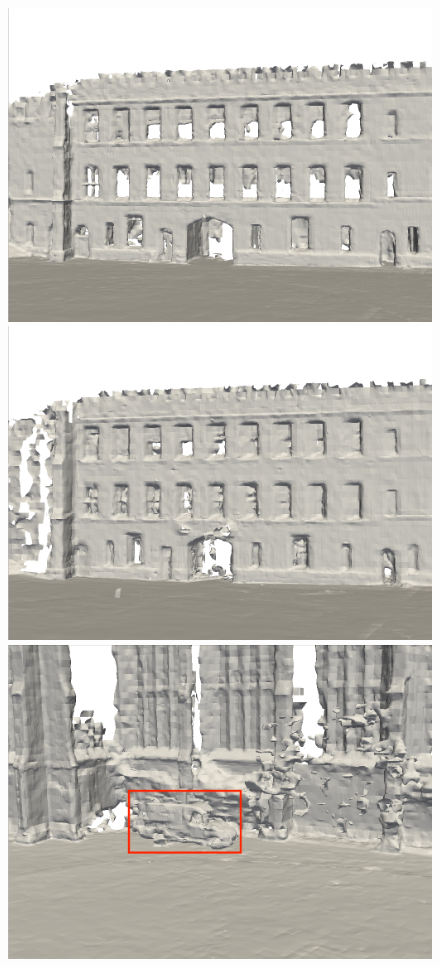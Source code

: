 \begin{figure}[htbp]
\begin{minipage}{0.5\linewidth}
    \includegraphics[width=1\linewidth]{figures/ncd_2_vox.png}
\end{minipage}\hfill
\begin{minipage}{0.5\linewidth}
    \centering
    \includegraphics[width=1\linewidth]{figures/ncd_2_bec.png}
\end{minipage}
\vfill
\begin{minipage}{0.5\linewidth}
    \centering
    \includegraphics[width=1\linewidth]{figures/ncd_1_vox.png}

\end{minipage}
\end{figure}
